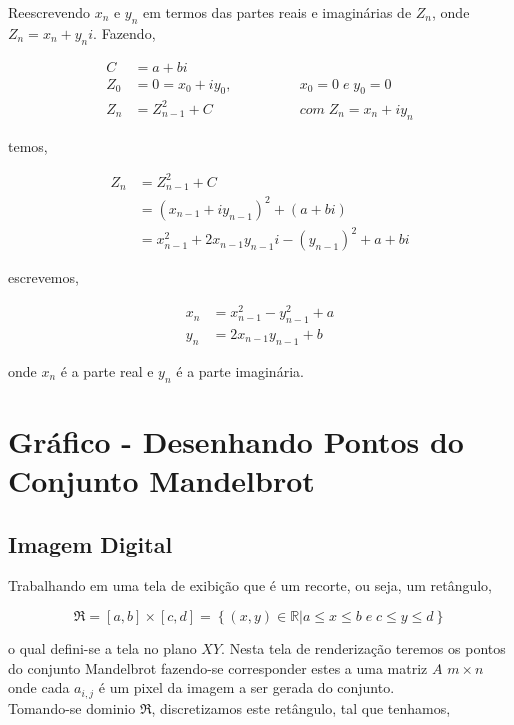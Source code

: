 \documentclass[12pt,a4paper]{article}
\begin{document}
	Reescrevendo $x_n$ e $y_n$ em termos das partes reais e imaginárias de $Z_n$, onde $Z_n = x_n + y_{n}i$. Fazendo,
	
	\begin{align}
		C &= a + bi &{} \\
		Z_0 &= 0 = x_0 + iy_0, &\qquad \qquad x_0=0 \; e \; y_0=0\\
		Z_{n} &= Z_{n-1}^2 + C  &\qquad \qquad com \; Z_n = x_n + iy_n
	\end{align}

	temos,
	
	\begin{align*}
		Z_{n} &= Z_{n-1}^2 + C \\
			&= ( x_{n-1} + iy_{n-1} )^2 + (a + bi) \\
			&= x_{n-1}^2 + 2x_{n-1}y_{n-1}i - (y_{n-1})^2 + a + bi
	\end{align*}
	
	escrevemos,
	
	\begin{align}
		x_n &= x_{n - 1}^2 - y_{n-1}^2 + a \\
		y_n &= 2x_{n-1}y_{n-1} + b
	\end{align}

	onde $x_n$ é a parte real e $y_n$ é a parte imaginária.

\newpage
\section{Gráfico - Desenhando Pontos do Conjunto Mandelbrot }


	
	\subsection{Imagem Digital}
	
	Trabalhando em uma tela de exibição que é um recorte, ou seja, um retângulo,
	
	 $$\mathfrak{R} = [a, b]\times[c, d] = \left\{ (x, y) \in \mathbb{R} | a \leq x \leq b \; e \; c \leq y \leq d \right\}$$
	 
	\noindent 
	o qual defini-se a tela no plano $XY$. Nesta tela de renderização teremos os pontos do conjunto Mandelbrot fazendo-se corresponder estes a uma matriz $A$ $m \times n$ onde cada $a_{i,j}$ é um pixel da imagem a ser gerada do conjunto.\\
	
	\noindent
	Tomando-se dominio $\mathfrak{R}$, discretizamos este retângulo, tal que tenhamos,
	
\end{document}

